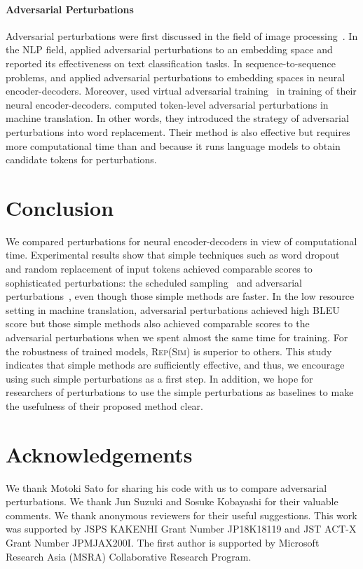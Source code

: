 \documentclass[11pt]{article}
\newcommand{\similarity}{\textsc{Rep(Sim)}}
\begin{document}
\paragraph{Adversarial Perturbations}
Adversarial perturbations were first discussed in the field of image processing~\cite{42503,Goodfellow2015}.
In the NLP field,  applied adversarial perturbations to an embedding space and reported its effectiveness on text classification tasks.
In sequence-to-sequence problems,  and  applied adversarial perturbations to embedding spaces in neural encoder-decoders.
Moreover,  used virtual adversarial training~\cite{miyato2016distributional} in training of their neural encoder-decoders.
 computed token-level adversarial perturbations in machine translation.
In other words, they introduced the strategy of adversarial perturbations into word replacement.
Their method is also effective but requires more computational time than  and  because it runs language models to obtain candidate tokens for perturbations.



\section{Conclusion}
We compared perturbations for neural encoder-decoders in view of computational time.
Experimental results show that simple techniques such as word dropout~\cite{NIPS2016_6241} and random replacement of input tokens achieved comparable scores to sophisticated perturbations: the scheduled sampling~\cite{NIPS2015_5956} and adversarial perturbations~\cite{sato-etal-2019-effective}, even though those simple methods are faster.
In the low resource setting in machine translation, adversarial perturbations achieved high BLEU score but those simple methods also achieved comparable scores to the adversarial perturbations when we spent almost the same time for training.
For the robustness of trained models, \similarity{} is superior to others.
This study indicates that simple methods are sufficiently effective, and thus, we encourage using such simple perturbations as a first step.
In addition, we hope for researchers of perturbations to use the simple perturbations as baselines to make the usefulness of their proposed method clear.

\section*{Acknowledgements}
We thank Motoki Sato for sharing his code with us to compare adversarial perturbations.
We thank Jun Suzuki and Sosuke Kobayashi for their valuable comments.
We thank anonymous reviewers for their useful suggestions.
This work was supported by JSPS KAKENHI Grant Number JP18K18119 and JST ACT-X Grant Number JPMJAX200I.
The first author is supported by Microsoft Research Asia (MSRA) Collaborative Research Program.
\end{document}
